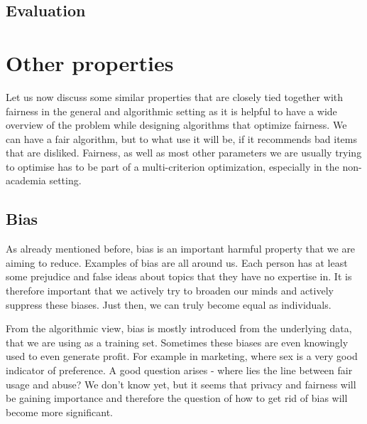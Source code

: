 \subsection{Evaluation} \label{sec:02_evaluation}


\section{Other properties} \label{sec:02_other_properties}
Let us now discuss some similar properties that are closely tied together with fairness in the general and algorithmic setting as it is helpful to have a wide overview of the problem while designing algorithms that optimize fairness. We can have a fair algorithm, but to what use it will be, if it recommends bad items that are disliked. Fairness, as well as most other parameters we are usually trying to optimise has to be part of a multi-criterion optimization, especially in the non-academia setting.

\subsection{Bias}
As already mentioned before, bias is an important harmful property that we are aiming to reduce. Examples of bias are all around us. Each person has at least some prejudice and false ideas about topics that they have no expertise in. It is therefore important that we actively try to broaden our minds and actively suppress these biases. Just then, we can truly become equal as individuals.

From the algorithmic view, bias is mostly introduced from the underlying data, that we are using as a training set. Sometimes these biases are even knowingly used to even generate profit. For example in marketing, where sex is a very good indicator of preference. A good question arises - where lies the line between fair usage and abuse? We don't know yet, but it seems that privacy and fairness will be gaining importance and therefore the question of how to get rid of bias will become more significant.


